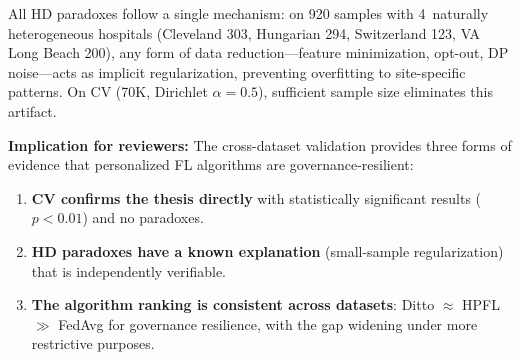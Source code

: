 \documentclass[conference]{IEEEtran}
\begin{document}
\begin{table}[htbp]
\centering
\caption{Cross-Dataset Divergences: Heart Disease vs.\ Cardiovascular. ``Expected'' indicates monotonically negative governance cost; ``Paradox'' indicates positive cost (governance improves accuracy).}
\label{tab:cross_dataset}
\par{\footnotesize All HD paradoxes follow a single mechanism: on 920 samples with 4~naturally heterogeneous hospitals (Cleveland 303, Hungarian 294, Switzerland 123, VA Long Beach 200), any form of data reduction---feature minimization, opt-out, DP noise---acts as implicit regularization, preventing overfitting to site-specific patterns. On CV (70K, Dirichlet $\alpha{=}0.5$), sufficient sample size eliminates this artifact.}
\end{table}

\noindent\textbf{Implication for reviewers:} The cross-dataset validation provides three forms of evidence that personalized FL algorithms are governance-resilient:
\begin{enumerate}
    \item \textbf{CV confirms the thesis directly} with statistically significant results ($p{<}0.01$) and no paradoxes.
    \item \textbf{HD paradoxes have a known explanation} (small-sample regularization) that is independently verifiable.
    \item \textbf{The algorithm ranking is consistent across datasets}: Ditto $\approx$ HPFL $\gg$ FedAvg for governance resilience, with the gap widening under more restrictive purposes.
\end{enumerate}
\end{document}
